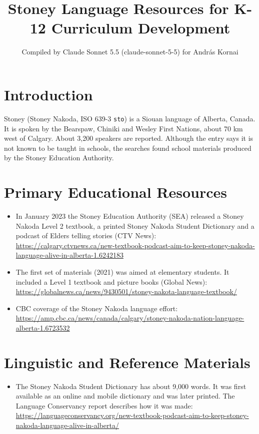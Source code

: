 \documentclass[12pt]{article}
\title{Stoney Language Resources for K-12 Curriculum Development}
\author{Compiled by Claude Sonnet 5.5 (claude-sonnet-5-5) for Andr\'as Kornai}
\date{}
\begin{document}
\maketitle

\section{Introduction}
Stoney (Stoney Nakoda, ISO 639-3 \texttt{sto}) is a Siouan language of Alberta, Canada. It is spoken by the Bearspaw, Chiniki and Wesley First Nations, about 70 km west of Calgary. About 3,200 speakers are reported. Although the entry says it is not known to be taught in schools, the searches found school materials produced by the Stoney Education Authority.

\section{Primary Educational Resources}
\begin{itemize}
\item In January 2023 the Stoney Education Authority (SEA) released a Stoney Nakoda Level 2 textbook, a printed Stoney Nakoda Student Dictionary and a podcast of Elders telling stories (CTV News): \url{https://calgary.ctvnews.ca/new-textbook-podcast-aim-to-keep-stoney-nakoda-language-alive-in-alberta-1.6242183}
\item The first set of materials (2021) was aimed at elementary students. It included a Level 1 textbook and picture books (Global News): \url{https://globalnews.ca/news/9430501/stoney-nakota-language-textbook/}
\item CBC coverage of the Stoney Nakoda language effort: \url{https://amp.cbc.ca/news/canada/calgary/stoney-nakoda-nation-language-alberta-1.6723532}
\end{itemize}

\section{Linguistic and Reference Materials}
\begin{itemize}
\item The Stoney Nakoda Student Dictionary has about 9,000 words. It was first available as an online and mobile dictionary and was later printed. The Language Conservancy report describes how it was made: \url{https://languageconservancy.org/new-textbook-podcast-aim-to-keep-stoney-nakoda-language-alive-in-alberta/}
\end{itemize}
\end{document}
